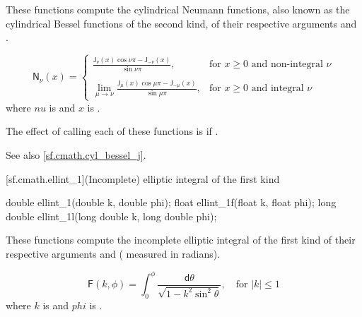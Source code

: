 \begin{itemdescr}

\pnum\effects
These functions compute the cylindrical Neumann functions,
also known as the cylindrical Bessel functions of the second kind,
of their respective arguments
 and .

\pnum\returns
\[%
  \mathsf{N}_\nu(x) =
  \left\{
  \begin{array}{cl}
  \displaystyle
  \frac{\mathsf{J}_\nu(x) \cos \nu\pi - \mathsf{J}_{-\nu}(x)}
       {\sin \nu\pi },
  & \mbox{for $x \ge 0$ and non-integral $\nu$}
  \\
  \\
  \displaystyle
  \lim_{\mu \rightarrow \nu} \frac{\mathsf{J}_\mu(x) \cos \mu\pi - \mathsf{J}_{-\mu}(x)}
                                {\sin \mu\pi },
  & \mbox{for $x \ge 0$ and integral $\nu$}
  \end{array}
  \right.
\]
where
$nu$ is  and
$x$ is .

\pnum\remark
The effect of calling each of these functions
is 
if .

\pnum See also \ref{sf.cmath.cyl_bessel_j}.
\end{itemdescr}

[sf.cmath.ellint_1]{(Incomplete) elliptic integral of the first kind}%
%
%
%
%
%
\begin{itemdecl}
double       ellint_1(double k, double phi);
float        ellint_1f(float k, float phi);
long double  ellint_1l(long double k, long double phi);
\end{itemdecl}

\begin{itemdescr}

\pnum\effects
These functions compute
the incomplete elliptic integral of the first kind
of their respective arguments
 and  ( measured in radians).

\pnum\returns
\[%
  \mathsf{F}(k, \phi) =
  \int_0^\phi \! \frac{\mathsf{d}\theta}
                      {\sqrt{1 - k^2 \sin^2 \theta}},
	   \quad \mbox{for $|k| \le 1$}
\]
where
$k$ is  and
$phi$ is .
\end{itemdescr}

